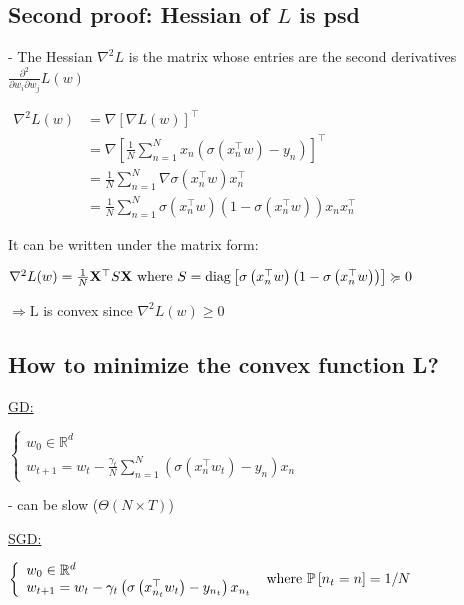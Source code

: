 \subsection*{Second proof: Hessian of $L$ is psd}
- The Hessian $\nabla^{2} L$ is the matrix whose entries are the second derivatives $\frac{\partial^{2}}{\partial w_{i} \partial w_{j}} L(w)$

$
\begin{aligned}
\nabla^{2} L(w) & =\nabla[\nabla L(w)]^{\top} \\
& =\nabla\left[\frac{1}{N} \sum_{n=1}^{N} x_{n}\left(\sigma\left(x_{n}^{\top} w\right)-y_{n}\right)\right]^{\top} \\
& =\frac{1}{N} \sum_{n=1}^{N} \nabla \sigma\left(x_{n}^{\top} w\right) x_{n}^{\top} \\
& =\frac{1}{N} \sum_{n=1}^{N} \sigma\left(x_{n}^{\top} w\right)\left(1-\sigma\left(x_{n}^{\top} w\right)\right) x_{n} x_{n}^{\top}
\end{aligned}
$

It can be written under the matrix form:

$
\nabla^{2} L(w)=\frac{1}{N} \mathbf{X}^{\top} S \mathbf{X} \\ \text { where } S=\operatorname{diag}\left[\sigma\left(x_{n}^{\top} w\right)\left(1-\sigma\left(x_{n}^{\top} w\right)\right)\right] \succcurlyeq 0
$

$\Rightarrow \mathrm{L}$ is convex since $\nabla^{2} L(w) \geqslant 0$

\subsection*{How to minimize the convex function L?}
\underline{GD:}

$
\left\{\begin{array}{l}
w_{0} \in \mathbb{R}^{d} \\
w_{t+1}=w_{t}-\frac{\gamma_{t}}{N} \sum_{n=1}^{N}\left(\sigma\left(x_{n}^{\top} w_{t}\right)-y_{n}\right) x_{n}
\end{array}\right.
$

- can be slow ($\Theta(N\times T)$)

\underline{SGD:}

$
\left\{\begin{array}{l}
w_{0} \in \mathbb{R}^{d} \\
w_{t+1}=w_{t}-\gamma_{t}\left(\sigma\left(x_{n_{t}}^{\top} w_{t}\right)-y_{n_{t}}\right) x_{n_{t}}
\end{array}\right. \\ \text { where } \mathbb{P}\left[n_{t}=n\right]=1 / N
$

